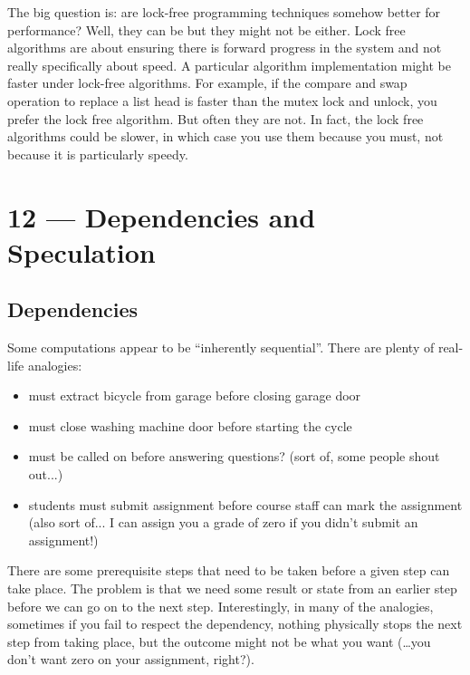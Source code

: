 \documentclass[a4paper]{report}
\begin{document}
The big question is: are lock-free programming techniques somehow better for performance? Well, they can be but they might not be either. Lock free algorithms are about ensuring there is forward progress in the system and not really specifically about speed. A particular algorithm implementation might be faster under lock-free algorithms. For example, if the compare and swap operation to replace a list head is faster than the mutex lock and unlock, you prefer the lock free algorithm. But often they are not. In fact, the lock free algorithms could be slower, in which case you use them because you must, not because it is particularly speedy.









\chapter*{12 --- Dependencies and Speculation}


\section*{Dependencies}
Some computations appear to be ``inherently sequential''. There are plenty of real-life analogies:

\begin{itemize}
\item must extract bicycle from garage before closing garage door
 
\item must close washing machine door before starting the cycle
 
\item must be called on before answering questions? (sort of, some people shout out...)
 
\item students must submit assignment before course staff can mark the assignment (also sort of... I can assign you a grade of zero if you didn't submit an assignment!)
\end{itemize}

There are some prerequisite steps that need to be taken before a given step can take place. The problem is that we need some result or state from an earlier step before we can go on to the next step. Interestingly, in many of the analogies, sometimes if you fail to respect the dependency, nothing physically stops the next step from taking place, but the outcome might not be what you want (\ldots you don't want zero on your assignment, right?).
\end{document}
